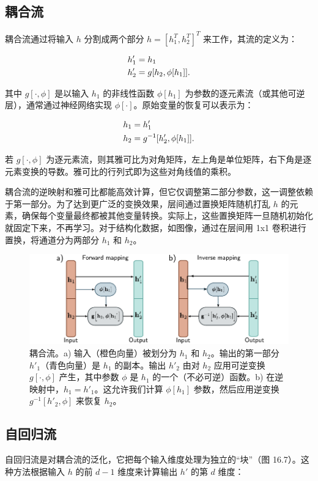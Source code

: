 \documentclass[lang=cn,newtx,10pt,scheme=chinese]{elegantbook}
\begin{document}
\subsection{耦合流}
耦合流通过将输入 \(h\) 分割成两个部分 \(h = [h_1^T, h_2^T]^T\) 来工作，其流的定义为：

\begin{align}
&h_1' = h_1 \notag \\
&h_2' = g[h_2, \phi[h_1]]. 
\end{align} 


其中 \(g[\cdot, \phi]\) 是以输入 \(h_1\) 的非线性函数 \(\phi[h_1]\) 为参数的逐元素流（或其他可逆层），通常通过神经网络实现 \(\phi[\cdot]\)。原始变量的恢复可以表示为：


\begin{align}
&h_1 = h_1' \notag \\
&h_2 = g^{-1}[h_2', \phi[h_1]]. 
\end{align} 


若 \(g[\cdot, \phi]\) 为逐元素流，则其雅可比为对角矩阵，左上角是单位矩阵，右下角是逐元素变换的导数。雅可比的行列式即为这些对角线值的乘积。

耦合流的逆映射和雅可比都能高效计算，但它仅调整第二部分参数，这一调整依赖于第一部分。为了达到更广泛的变换效果，层间通过置换矩阵随机打乱 \(h\) 的元素，确保每个变量最终都被其他变量转换。实际上，这些置换矩阵一旦随机初始化就固定下来，不再学习。对于结构化数据，如图像，通过在层间用 1x1 卷积进行置换，将通道分为两部分 \(h_1\) 和 \(h_2\)。

\begin{figure}[ht!]
\centering
\includegraphics[width=0.7\linewidth]{PDFFigures/UDLChap16PDF/FlowCoupling.pdf}
\caption{耦合流。a) 输入（橙色向量）被划分为 \( h_1 \) 和 \( h_2 \)。输出的第一部分 \( h'_1 \)（青色向量）是 \( h_1 \) 的副本。输出 \( h'_2 \) 由对 \( h_2 \) 应用可逆变换 \( g[\cdot, \phi] \) 产生，其中参数 \( \phi \) 是 \( h_1 \) 的一个（不必可逆）函数。b) 在逆映射中，\( h_1 = h'_1 \)。这允许我们计算 \( \phi[h_1] \) 参数，然后应用逆变换 \( g^{-1}[h'_2, \phi] \) 来恢复 \( h_2 \)。}
\end{figure}


\subsection{自回归流}
自回归流是对耦合流的泛化，它把每个输入维度处理为独立的“块”（图 16.7）。这种方法根据输入 \(h\) 的前 \(d-1\) 维度来计算输出 \(h'\) 的第 \(d\) 维度：
\end{document}
